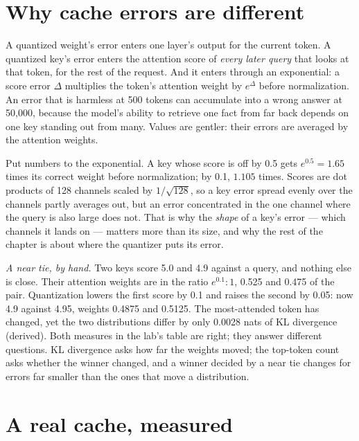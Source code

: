 \section{Why cache errors are different}

A quantized weight's error enters one layer's output for the current token. A
quantized key's error enters the attention score of \emph{every later query}
that looks at that token, for the rest of the request. And it enters through an
exponential: a score error $\Delta$ multiplies the token's attention weight by
$e^{\Delta}$ before normalization. An error that is harmless at 500 tokens can
accumulate into a wrong answer at 50,000, because the model's ability to
retrieve one fact from far back depends on one key standing out from many.
Values are gentler: their errors are averaged by the attention weights.

Put numbers to the exponential. A key whose score is off by 0.5 gets
$e^{0.5} = 1.65$ times its correct weight before normalization; by 0.1,
$1.105$ times. Scores are dot products of 128 channels scaled by
$1/\sqrt{128}$, so a key error spread evenly over the channels partly averages
out, but an error concentrated in the one channel where the query is also
large does not. That is why the \emph{shape} of a key's error --- which channels
it lands on --- matters more than its size, and why the rest of the chapter is
about where the quantizer puts its error.

\emph{A near tie, by hand.} Two keys score 5.0 and 4.9 against a query, and
nothing else is close. Their attention weights are in the ratio $e^{0.1}:1$,
0.525 and 0.475 of the pair. Quantization lowers the first score by 0.1 and
raises the second by 0.05: now 4.9 against 4.95, weights 0.4875 and 0.5125. The
most-attended token has changed, yet the two distributions differ by only 0.0028
nats of KL divergence (derived). Both measures in the lab's table are right; they
answer different questions. KL divergence asks how far the weights moved; the
top-token count asks whether the winner changed, and a winner decided by a near
tie changes for errors far smaller than the ones that move a distribution.

\section{A real cache, measured}

